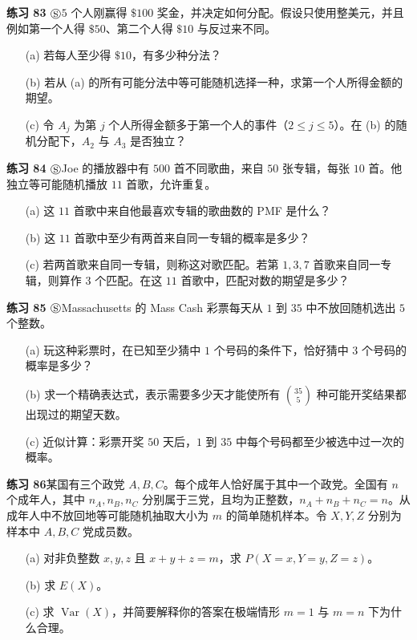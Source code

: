 \documentclass[UTF8, 12pt, fontset=fandol, oneside]{ctexart}
\begin{document}
\noindent\textbf{练习 83 $\circledS$}\quad $5$ 个人刚赢得 $\$100$ 奖金，并决定如何分配。假设只使用整美元，并且例如第一个人得 $\$50$、第二个人得 $\$10$ 与反过来不同。
\begin{enumerate}
  \item[(a)] 若每人至少得 $\$10$，有多少种分法？
  \item[(b)] 若从 (a) 的所有可能分法中等可能随机选择一种，求第一个人所得金额的期望。
  \item[(c)] 令 $A_j$ 为第 $j$ 个人所得金额多于第一个人的事件（$2\le j\le5$）。在 (b) 的随机分配下，$A_2$ 与 $A_3$ 是否独立？
\end{enumerate}

\noindent\textbf{练习 84 $\circledS$}\quad Joe 的播放器中有 $500$ 首不同歌曲，来自 $50$ 张专辑，每张 $10$ 首。他独立等可能随机播放 $11$ 首歌，允许重复。
\begin{enumerate}
  \item[(a)] 这 $11$ 首歌中来自他最喜欢专辑的歌曲数的 PMF 是什么？
  \item[(b)] 这 $11$ 首歌中至少有两首来自同一专辑的概率是多少？
  \item[(c)] 若两首歌来自同一专辑，则称这对歌匹配。若第 $1,3,7$ 首歌来自同一专辑，则算作 $3$ 个匹配。在这 $11$ 首歌中，匹配对数的期望是多少？
\end{enumerate}

\noindent\textbf{练习 85 $\circledS$}\quad Massachusetts 的 Mass Cash 彩票每天从 $1$ 到 $35$ 中不放回随机选出 $5$ 个整数。
\begin{enumerate}
  \item[(a)] 玩这种彩票时，在已知至少猜中 $1$ 个号码的条件下，恰好猜中 $3$ 个号码的概率是多少？
  \item[(b)] 求一个精确表达式，表示需要多少天才能使所有 $\binom{35}{5}$ 种可能开奖结果都出现过的期望天数。
  \item[(c)] 近似计算：彩票开奖 $50$ 天后，$1$ 到 $35$ 中每个号码都至少被选中过一次的概率。
\end{enumerate}

\noindent\textbf{练习 86}\quad 某国有三个政党 $A,B,C$。每个成年人恰好属于其中一个政党。全国有 $n$ 个成年人，其中 $n_A,n_B,n_C$ 分别属于三党，且均为正整数，$n_A+n_B+n_C=n$。从成年人中不放回地等可能随机抽取大小为 $m$ 的简单随机样本。令 $X,Y,Z$ 分别为样本中 $A,B,C$ 党成员数。
\begin{enumerate}
  \item[(a)] 对非负整数 $x,y,z$ 且 $x+y+z=m$，求 $P(X=x,Y=y,Z=z)$。
  \item[(b)] 求 $E(X)$。
  \item[(c)] 求 $\operatorname{Var}(X)$，并简要解释你的答案在极端情形 $m=1$ 与 $m=n$ 下为什么合理。
\end{enumerate}
\end{document}
